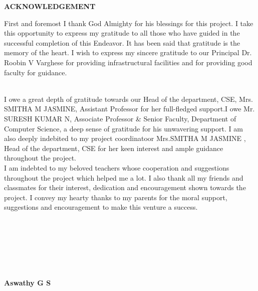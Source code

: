 	\begin{center}
		\textbf{\LARGE{ACKNOWLEDGEMENT}}\\[0.5cm]
	\end{center}
	First and foremost I thank God Almighty for his blessings for this project. I take this opportunity to express my gratitude to all those who have guided in the successful completion of this Endeavor. It has been said that gratitude is the memory of the heart. I wish to express my sincere gratitude to our Principal Dr. Roobin V Varghese for providing infrastructural facilities and for providing good faculty for guidance.\textbf{\\} \textbf{\\}
	
	I owe a great depth of gratitude towards our Head of the department, CSE, Mrs. SMITHA M JASMINE,  Assistant Professor for her full-fledged support.I owe Mr. SURESH KUMAR N, Associate Professor \& Senior Faculty, Department of Computer Science, a deep sense of gratitude for his unwavering support. I am also deeply indebited to my project coordinatoor Mrs.SMITHA M JASMINE ,  Head of the department, CSE for her keen interest and ample guidance throughout the project.  \\

	I am indebted to my beloved teachers whose cooperation and suggestions throughout the project which helped me a lot. I also thank all my friends and classmates for their interest, dedication and encouragement shown towards the project. I convey my hearty thanks to my parents for the moral support,  suggestions and encouragement to make this venture a success.\textbf{\\}\textbf{\\}\textbf{\\}\textbf{\\}\textbf{\\}\textbf{\\}\textbf{\\}
	
	\hspace{9cm}
	\textbf{Aswathy G S}
	

